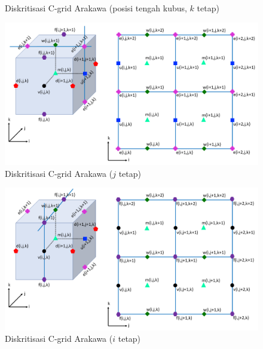 \begin{spacing}{1.5}
\begin{figure}[H]
		\caption{Diskritisasi C-grid Arakawa (posisi tengah kubus, $k$ tetap)}
		\label{fig:arakawa_3}
	\end{figure}
		\begin{figure}[H]
		\centering
		\includegraphics[width=1\textwidth]{contents/Arakawa_4.png}	
		\caption{Diskritisasi C-grid Arakawa ($j$ tetap)}
		\label{fig:arakawa_4}
	\end{figure}
		\begin{figure}[H]
		\centering
		\includegraphics[width=1\textwidth]{contents/Arakawa_5.png}	
		\caption{Diskritisasi C-grid Arakawa ($i$ tetap)}
		\label{fig:arakawa_5}
	\end{figure}
\end{spacing}